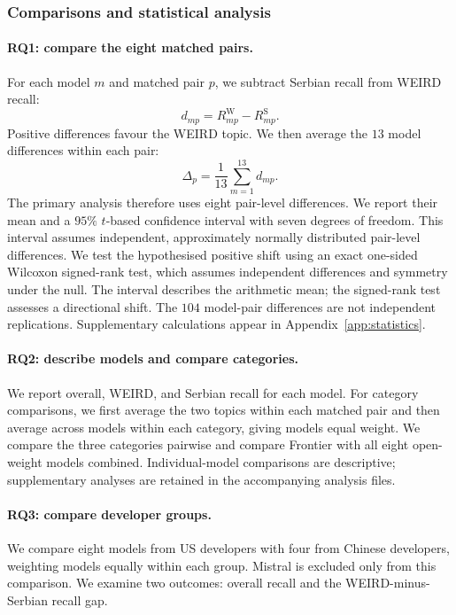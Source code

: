 \documentclass[11pt,a4paper]{article}
\begin{document}
\subsubsection{Comparisons and statistical analysis}
\label{sec:statistics}

\paragraph{RQ1: compare the eight matched pairs.}
For each model $m$ and matched pair $p$, we subtract Serbian recall from WEIRD recall:
\begin{equation}
d_{mp}=R_{mp}^{\mathrm W}-R_{mp}^{\mathrm S}.
\label{eq:pair-gap}
\end{equation}
Positive differences favour the WEIRD topic. We then average the $13$ model differences within each pair:
\begin{equation}
\Delta_p=\frac{1}{13}\sum_{m=1}^{13}d_{mp}.
\label{eq:pair-mean}
\end{equation}
The primary analysis therefore uses eight pair-level differences. We report their mean and a $95\%$ $t$-based confidence interval with seven degrees of freedom. This interval assumes independent, approximately normally distributed pair-level differences. We test the hypothesised positive shift using an exact one-sided Wilcoxon signed-rank test, which assumes independent differences and symmetry under the null. The interval describes the arithmetic mean; the signed-rank test assesses a directional shift. The $104$ model-pair differences are not independent replications. Supplementary calculations appear in Appendix~\ref{app:statistics}.

\paragraph{RQ2: describe models and compare categories.}
We report overall, WEIRD, and Serbian recall for each model. For category comparisons, we first average the two topics within each matched pair and then average across models within each category, giving models equal weight. We compare the three categories pairwise and compare Frontier with all eight open-weight models combined. Individual-model comparisons are descriptive; supplementary analyses are retained in the accompanying analysis files.

\paragraph{RQ3: compare developer groups.}
We compare eight models from US developers with four from Chinese developers, weighting models equally within each group. Mistral is excluded only from this comparison. We examine two outcomes: overall recall and the WEIRD-minus-Serbian recall gap.
\end{document}
